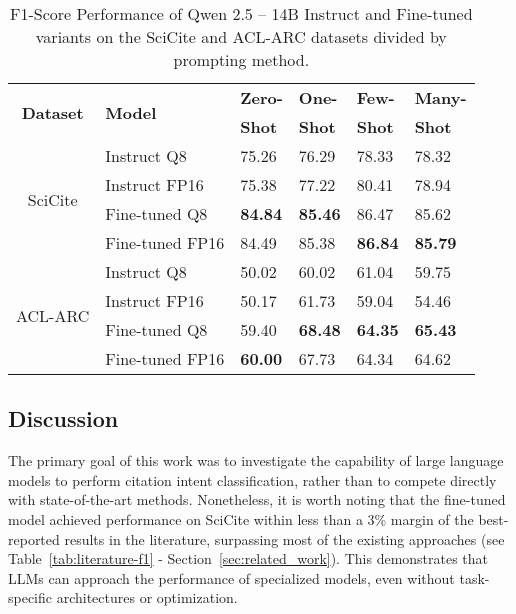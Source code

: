 \begin{table}[t]
    \centering
    \scriptsize
    \begin{tabular}{clllll}
      \hline
      \multirow{2}{*}{\textbf{Dataset}}         & \multirow{2}{*}{\textbf{Model}}    & \textbf{Zero-}   & \textbf{One-}   & \textbf{Few-}   & \textbf{Many-}  \\
                                &                   & \textbf{Shot}   & \textbf{Shot}        & \textbf{Shot}             & \textbf{Shot}  \\

      \hline
      \multirow{4}{*}{SciCite}  & Instruct Q8       & 75.26             & 76.29             & 78.33             & 78.32             \\
                                & Instruct FP16     & 75.38             & 77.22             & 80.41             & 78.94             \\
                                & Fine-tuned Q8      & \textbf{84.84}    & \textbf{85.46}    & 86.47             & 85.62             \\
                                & Fine-tuned FP16    & 84.49             & 85.38             & \textbf{86.84}    & \textbf{85.79}    \\
      \hline
      \multirow{4}{*}{ACL-ARC}  & Instruct Q8       & 50.02             & 60.02             & 61.04             & 59.75             \\
                                & Instruct FP16     & 50.17             & 61.73             & 59.04             & 54.46             \\
                                & Fine-tuned Q8      & 59.40             & \textbf{68.48}    & \textbf{64.35}    & \textbf{65.43}    \\
                                & Fine-tuned FP16    & \textbf{60.00}    & 67.73             & 64.34             & 64.62             \\
      \hline
    \end{tabular}
    \caption{F1-Score Performance of Qwen 2.5 – 14B Instruct and Fine-tuned variants on the SciCite and ACL-ARC datasets divided by prompting method.}\label{tab:results-pm}
\end{table}

\subsection{Discussion}

The primary goal of this work was to investigate the capability of large language models to perform citation intent classification, rather than to compete directly with state-of-the-art methods. Nonetheless, it is worth noting that the fine-tuned model achieved performance on SciCite within less than a 3\% margin of the best-reported results in the literature, surpassing most of the existing approaches (see Table~\ref{tab:literature-f1} - Section~\ref{sec:related_work}). This demonstrates that LLMs can approach the performance of specialized models, even without task-specific architectures or optimization.

